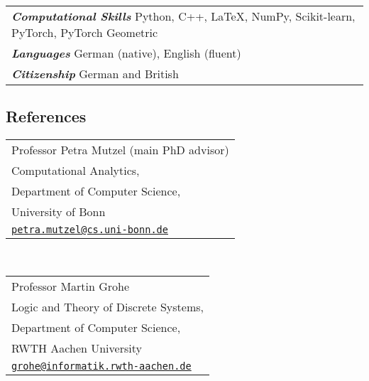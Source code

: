 \documentclass[11pt, a4paper, DIV=14, headings=small]{scrartcl}
\begin{document}
	\begin{tabular}{l}
		\textsf{\textbf{\em Computational Skills}} Python, C\hspace{-1pt}+\hspace{-1pt}+, \LaTeX, NumPy, Scikit-learn, PyTorch, PyTorch Geometric \\
		\textsf{\textbf{\em Languages}} German (native), English (fluent)                                                                         \\
		\textsf{\textbf{\em Citizenship}} German and British\\
	\end{tabular}
		\renewcommand{\arraystretch}{1.0}
	\subsection*{References}
	
	\begin{tabular}{l}
		Professor Petra Mutzel (main PhD advisor)                                       \\
		Computational Analytics,                                                        \\
		Department of Computer Science,                                                 \\
		University of Bonn                                                              \\
		\href{mailto:petra.mutzel@cs.uni-bonn.de}{\texttt{petra.mutzel@cs.uni-bonn.de}} \\
	\end{tabular}\\[0.5em]
	
	
	\begin{tabular}{l}
		Professor Martin Grohe                                                    \\
		Logic and Theory of Discrete Systems,                                                   \\
		Department of Computer Science,                                                         \\
		RWTH Aachen University                                                                  \\
		\href{mailto:grohe@informatik.rwth-aachen.de}{\texttt{grohe@informatik.rwth-aachen.de}} \\
	\end{tabular}\\[0.5em]
	
\end{document}
